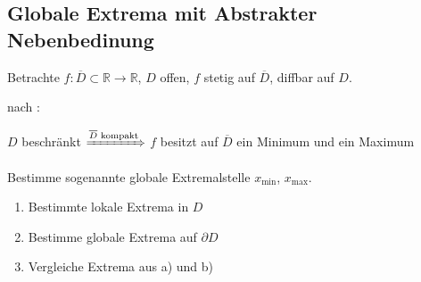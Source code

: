 \subsection{Globale Extrema mit Abstrakter Nebenbedinung}
Betrachte $f:\overline{D}\subset\mathbb{R}\to\mathbb{R}$, $D$ offen, $f$ stetig auf $\overline{D}$, \gls{diffbar} auf $D$.

\begin{underlinedenvironment}[Existenz]
	nach :
	
	$D$ beschränkt $\xRightarrow{\text{$\overline{D}$ kompakt}}$ $f$ besitzt auf $\overline{D}$ ein Minimum und ein Maximum
\end{underlinedenvironment}

\begin{underlinedenvironment}[Frage]
	Bestimme sogenannte globale Extremalstelle $x_{\min}$, $x_{\max}$.
\end{underlinedenvironment}

\begin{underlinedenvironment}[Strategie]\vspace*{0pt}
	\begin{enumerate}[label={\alph*)},topsep=\dimexpr-\baselineskip/2\relax]
		\item Bestimmte lokale Extrema in $D$
		\item Bestimme globale Extrema auf $\partial D$
		\item Vergleiche Extrema aus a) und b)
	\end{enumerate}
\end{underlinedenvironment}

